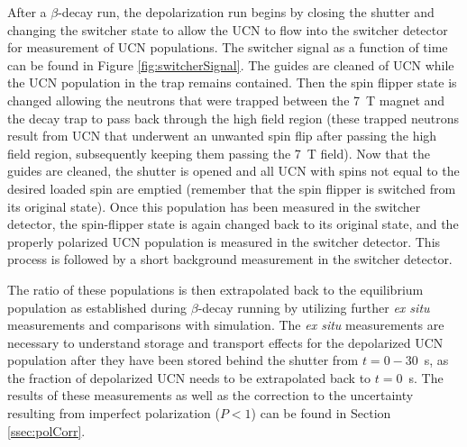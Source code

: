 After a $\beta$-decay run, the depolarization run begins by closing the shutter and changing the switcher
state to allow
the UCN to flow into the switcher detector for measurement of UCN populations. The switcher signal
as a function of time can be found in Figure \ref{fig:switcherSignal}. The guides are cleaned of UCN while
the UCN population in the trap remains contained. Then the spin flipper state is changed allowing the
neutrons that were trapped between the 7~T magnet and the decay trap to pass back through the high
field region (these trapped neutrons result from UCN that underwent an unwanted spin flip after passing
the high field region, subsequently keeping them passing the 7~T field). Now that the guides are cleaned,
the shutter is opened and all UCN with spins not equal to the desired loaded spin are emptied (remember that
the spin flipper is switched from its original state). Once this population has been measured in the
switcher detector, the spin-flipper state is again changed back to its original state, and the
properly polarized UCN population is measured in the switcher detector. This process is followed by a short
background measurement in the switcher detector.

The ratio of these populations is then extrapolated back to the equilibrium population as established
during $\beta$-decay running by utilizing further \textit{ex situ} measurements and comparisons with
simulation. The \textit{ex situ} measurements are necessary to understand storage and transport effects
for the depolarized UCN population after they have been stored behind the shutter from $t=0-30$~s, as the
fraction of depolarized UCN needs to be extrapolated back to $t=0$~s.
The results of these measurements as well as the correction to the uncertainty resulting
from imperfect polarization ($P<1$) can be found in Section \ref{ssec:polCorr}.





